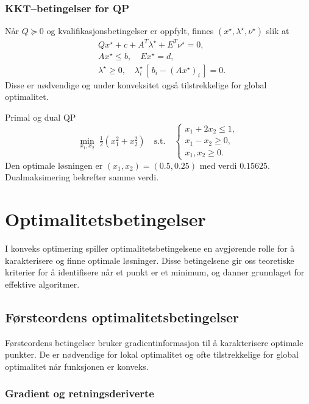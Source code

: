 \subsection{KKT--betingelser for QP}
Når $Q\succeq0$ og kvalifikasjonsbetingelser er oppfylt, finnes $(x^\star,\lambda^\star,\nu^\star)$ slik at
\begin{align*}
	&Qx^\star + c + A^T\lambda^\star + E^T\nu^\star = 0,\\
	&A x^\star \le b,\quad E x^\star = d,\\
	&\lambda^\star\ge0,\quad \lambda_i^\star\,[\,b_i - (A x^\star)_i\,]=0.
\end{align*}
Disse er nødvendige og under konveksitet også tilstrekkelige for global optimalitet.

\begin{example}{Primal og dual QP}{}
\[
	\min_{x_1,x_2}\;\tfrac12(x_1^2 + x_2^2)
	\quad\text{s.t.}\quad
	\begin{cases}
		x_1 + 2x_2 \le 1,\\
		x_1 - x_2 \ge 0,\\
		x_1,x_2\ge0.
	\end{cases}
\]
Den optimale løsningen er $(x_1,x_2)=(0.5,0.25)$ med verdi $0.15625$. Dualmaksimering bekrefter samme verdi.
\end{example}
\chapter{Optimalitetsbetingelser}
\label{chap:optimality_conditions}

I konveks optimering spiller optimalitetsbetingelsene en avgjørende rolle for å karakterisere og finne optimale løsninger. Disse betingelsene gir oss teoretiske kriterier for å identifisere når et punkt er et minimum, og danner grunnlaget for effektive algoritmer.

\section{Førsteordens optimalitetsbetingelser}

Førsteordens betingelser bruker gradientinformasjon til å karakterisere optimale punkter. De er nødvendige for lokal optimalitet og ofte tilstrekkelige for global optimalitet når funksjonen er konveks.

\subsection{Gradient og retningsderiverte}

